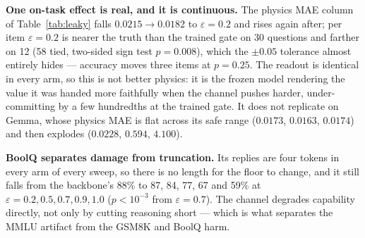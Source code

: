 \documentclass[11pt]{article}
\begin{document}
\textbf{One on-task effect is real, and it is continuous.} The physics MAE column of Table~\ref{tab:leaky} falls $0.0215 \to 0.0182$ to $\varepsilon = 0.2$ and rises again after; per item $\varepsilon = 0.2$ is nearer the truth than the trained gate on 30 questions and farther on 12 (58 tied, two-sided sign test $p = 0.008$), which the $\pm0.05$ tolerance almost entirely hides --- accuracy moves three items at $p = 0.25$. The readout is identical in every arm, so this is not better physics: it is the frozen model rendering the value it was handed more faithfully when the channel pushes harder, under-committing by a few hundredths at the trained gate. It does not replicate on Gemma, whose physics MAE is flat across its safe range ($0.0173$, $0.0163$, $0.0174$) and then explodes ($0.0228$, $0.594$, $4.100$).

\textbf{BoolQ separates damage from truncation.} Its replies are four tokens in every arm of every sweep, so there is no length for the floor to change, and it still falls from the backbone's 88\% to 87, 84, 77, 67 and 59\% at $\varepsilon = 0.2, 0.5, 0.7, 0.9, 1.0$ ($p < 10^{-3}$ from $\varepsilon = 0.7$). The channel degrades capability directly, not only by cutting reasoning short --- which is what separates the MMLU artifact from the GSM8K and BoolQ harm.
\end{document}
